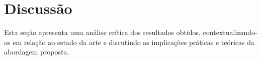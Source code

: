 \section{Discussão}
\label{sec:discussao}

Esta seção apresenta uma análise crítica dos resultados obtidos, contextualizando-os em relação ao estado da arte e discutindo as implicações práticas e teóricas da abordagem proposta.